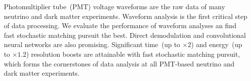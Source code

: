 Photomultiplier tube~(PMT) voltage waveforms are the raw data of many neutrino and dark matter experiments. Waveform analysis is the first critical step of data processing. We evaluate the performance of waveform analyses an find fast stochastic matching pursuit the best.  Direct demodulation and convolutional neural networks are also promising.  Significant time~(up to $\times 2$) and energy~(up to $\times 1.2$) resolution boosts are attainable with fast stochastic matching pursuit, which forms the cornerstones of data analysis at all PMT-based neutrino and dark matter experiments.